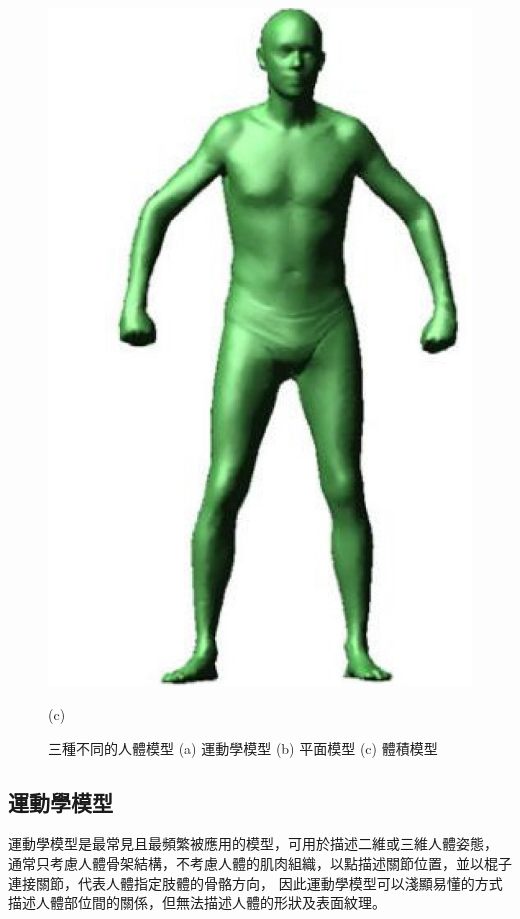 \begin{figure}[!ht]
\begin{minipage}{.33\textwidth}
      \includegraphics[width=\linewidth]{figure/ch2_fig_personal_planar_model.png}
      \caption*{(c)}
    \end{minipage}
    \captionsetup{justification=centering}
    \caption[三種不同的人體模型 (a) 運動學模型 (b) 平面模型 (c) 體積模型]{三種不同的人體模型 (a) 運動學模型 (b) 平面模型 (c) 體積模型}
    \label{ch2_fig_personal_model}
 \end{figure}

\subsection*{運動學模型}
運動學模型是最常見且最頻繁被應用的模型，可用於描述二維或三維人體姿態，
通常只考慮人體骨架結構，不考慮人體的肌肉組織，以點描述關節位置，並以棍子連接關節，代表人體指定肢體的骨骼方向，
因此運動學模型可以淺顯易懂的方式描述人體部位間的關係，但無法描述人體的形狀及表面紋理。

